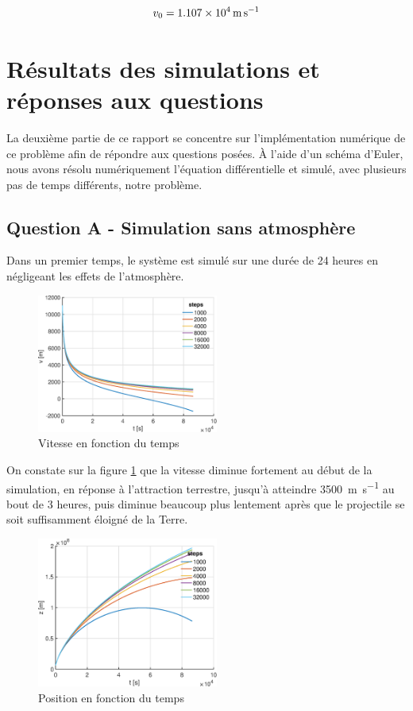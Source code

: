 \documentclass[a4paper,12pt,twoside]{article}
\begin{document}
\begin{equation}
    v_0 = \SI{1.107d4}{\meter\per\second}
    \label{val:v0}
\end{equation}


\section{Résultats des simulations et réponses aux questions}
La deuxième partie de ce rapport se concentre sur l'implémentation numérique de ce problème afin de répondre aux questions posées.
À l'aide d'un schéma d'Euler, nous avons résolu numériquement l'équation différentielle et simulé, avec plusieurs pas de temps différents, notre problème.

\subsection{Question A - Simulation sans atmosphère}
Dans un premier temps, le système est simulé sur une durée de 24 heures en négligeant les effets de l'atmosphère.

\begin{figure}[h]
	\centering
    \includegraphics[width=0.53\textwidth]{graphs/vA.eps}
    \caption{Vitesse en fonction du temps}
    \label{fig:A-vt}
\end{figure}

On constate sur la figure \ref{fig:A-vt} que la vitesse diminue fortement au début de la simulation, en réponse à l'attraction terrestre, jusqu'à atteindre \SI{3500}{\meter\per\second} au bout de 3 heures, puis diminue beaucoup plus lentement après que le projectile se soit suffisamment éloigné de la Terre.\\

\begin{figure}[h]
	\centering
	\includegraphics[width=0.53\textwidth]{graphs/zA.eps}
	\caption{Position en fonction du temps}
	\label{fig:A-zt}
\end{figure}
\end{document}
